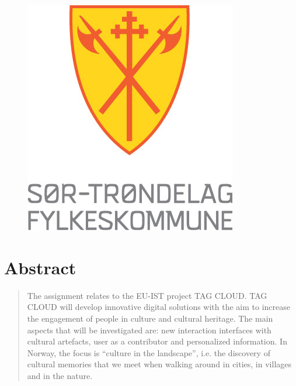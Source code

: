 \documentclass[11pt]{book}
\begin{document}
\begin{titlepage}
\begin{center}
\begin{figure}[hb]
\begin{minipage}[b]{0.35\linewidth}
				\centering
				\includegraphics[width=\textwidth]{images/stfk}
			\end{minipage}
		\end{figure}
		\vfill
		
	\end{center}
		
\end{titlepage}



\chapter{Abstract}
\begin{quotation}\noindent
The assignment relates to the EU-IST project TAG CLOUD. TAG CLOUD will develop innovative digital solutions with the aim to increase the engagement of people in culture and cultural heritage. The main aspects that will be investigated are: new interaction interfaces with cultural artefacts, user as a contributor and personalized information. In Norway, the focus is “culture in the landscape”, i.e. the discovery of cultural memories that we meet when walking around in cities, in villages and in the nature.  \cite[p. 47]{compendium}
\end{quotation}
\end{document}
